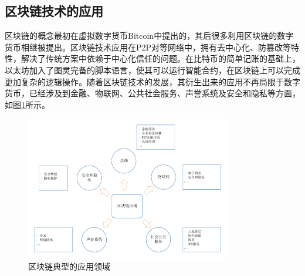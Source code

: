 %

\subsection{区块链技术的应用}

区块链的概念最初在虚拟数字货币Bitcoin中提出的\supercite{nakamoto2008bitcoin}，其后很多利用区块链的数字货币相继被提出。区块链技术应用在P2P对等网络中，拥有去中心化、防篡改等特性，解决了传统方案中依赖于中心化信任的问题。在比特币的简单记账的基础上，以太坊\supercite{buterin2013ethereum}加入了图灵完备的脚本语言，使其可以运行智能合约，在区块链上可以完成更加复杂的逻辑操作。随着区块链技术的发展，其衍生出来的应用不再局限于数字货币，已经涉及到金融、物联网、公共社会服务、声誉系统及安全和隐私等方面\supercite{zheng2016blockchain}，如图\ref{fig:applications}所示。

\begin{figure}[htbp]
 	\centering
 	\includegraphics[width = 0.8\textwidth]{img/applications}
 	\caption{区块链典型的应用领域}\label{fig:applications}
\end{figure}

